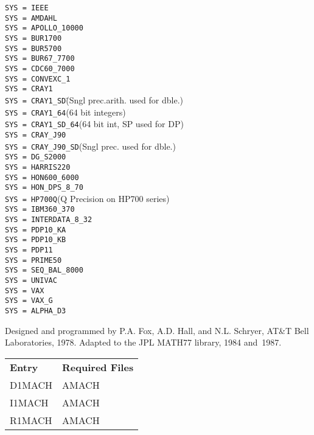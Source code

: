 \documentclass[twoside]{MATH77}
\begin{document}
\begin{tabbing}
{\tt SYS = IEEE}\\
{\tt SYS = AMDAHL}\\
{\tt SYS = APOLLO\_10000}\\
{\tt SYS = BUR1700}\\
{\tt SYS = BUR5700}\\
{\tt SYS = BUR67\_7700}\\
{\tt SYS = CDC60\_7000}\\
{\tt SYS = CONVEXC\_1}\\
{\tt SYS = CRAY1}\\
{\tt SYS = CRAY1\_SD}\hspace{30pt}\=(Sngl prec.arith. used for dble.)\\
{\tt SYS = CRAY1\_64}\>(64 bit integers)\\
{\tt SYS = CRAY1\_SD\_64}\>(64 bit int, SP used for DP)\\
{\tt SYS = CRAY\_J90}\\
{\tt SYS = CRAY\_J90\_SD}\>(Sngl prec. used for dble.)\\
{\tt SYS = DG\_S2000}\\
{\tt SYS = HARRIS220}\\
{\tt SYS = HON600\_6000}\\
{\tt SYS = HON\_DPS\_8\_70}\\
{\tt SYS = HP700Q}\>(Q Precision on HP700 series)\\
{\tt SYS = IBM360\_370}\\
{\tt SYS = INTERDATA\_8\_32}\\
{\tt SYS = PDP10\_KA}\\
{\tt SYS = PDP10\_KB}\\
{\tt SYS = PDP11}\\
{\tt SYS = PRIME50}\\
{\tt SYS = SEQ\_BAL\_8000}\\
{\tt SYS = UNIVAC}\\
{\tt SYS = VAX}\\
{\tt SYS = VAX\_G}\\
{\tt SYS = ALPHA\_D3}
\end{tabbing}

Designed and programmed by P.A. Fox, A.D. Hall, and N.L. Schryer, AT\&T Bell
Laboratories, 1978. Adapted to the JPL MATH77 library, 1984 and~1987.

\begin{tabular}{@{\bf}l@{\hspace{5pt}}l}
\bf Entry & \hspace{.2in} {\bf Required Files}\vspace{2pt} \\
D1MACH & \hspace{.35in} AMACH\\
I1MACH & \hspace{.35in} AMACH\\
R1MACH & \hspace{.35in} AMACH\\\end{tabular}
\end{document}
